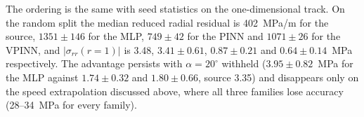 \documentclass[subscriptcorrection,upint,varvw,barcolor=Goldenrod3,mathalfa=cal=euler,balance,hyphenate,french,pdf-a]{asmejour} %
\begin{document}
The ordering is the same with seed statistics on the one-dimensional track. On the random split the median reduced radial residual is 402~MPa/m for the source, $1351\pm146$ for the MLP, $749\pm42$ for the PINN and $1071\pm26$ for the VPINN, and $|\sigma_{rr}(r{=}1)|$ is 3.48, $3.41\pm0.61$, $0.87\pm0.21$ and $0.64\pm0.14$~MPa respectively. The advantage persists with $\alpha=20^\circ$ withheld ($3.95\pm0.82$~MPa for the MLP against $1.74\pm0.32$ and $1.80\pm0.66$, source 3.35) and disappears only on the speed extrapolation discussed above, where all three families lose accuracy (28--34~MPa for every family). %
\end{document}
